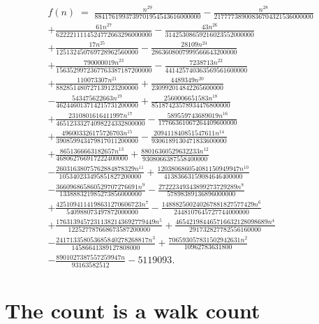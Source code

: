 \documentclass[11pt,a4paper]{article}
\theoremstyle{plain}
\theoremstyle{definition}
\begin{document}
\begin{multline*}
f(n)\;=\;\frac{n^{29}}{8841761993739701954543616000000} - \frac{n^{28}}{21777738900836704321536000000} \\
+ \frac{61 n^{27}}{6222211114524772663296000000} - \frac{43 n^{26}}{31425308659216023552000000} \\
+ \frac{17 n^{25}}{125132450769728962560000} - \frac{28109 n^{24}}{2863608007999566643200000} \\
+ \frac{790000019 n^{23}}{1563529972367763387187200000} - \frac{7238713 n^{22}}{441425740363569561600000} \\
+ \frac{110073307 n^{21}}{882851480727139123200000} + \frac{4489349 n^{20}}{230992014842265600000} \\
- \frac{543475622663 n^{19}}{462446013714215731200000} + \frac{2560006651583 n^{18}}{85187423578934476800000} \\
+ \frac{2310801616411997 n^{17}}{46512333274098224332800000} - \frac{589559743689019 n^{16}}{17766361067264409600000} \\
+ \frac{496003326175726703 n^{15}}{390859943479817011200000} - \frac{209411840851547611 n^{14}}{9306189130471833600000} \\
+ \frac{8651366663182657 n^{13}}{468062766917222400000} + \frac{88016360529632233 n^{12}}{9308066387558400000} \\
- \frac{26031638075762884878329 n^{11}}{105340233495851827200000} + \frac{120380686054081150949947 n^{10}}{41383663159084646400000} \\
- \frac{366096865860529707276691 n^{9}}{133888321985273856000000} - \frac{27222349343899273729289 n^{8}}{57898389136896000000} \\
+ \frac{4251094114198631270606723 n^{7}}{540988073497872000000} - \frac{148882500240267881827577429 n^{6}}{2448107645727744000000} \\
+ \frac{17631394572311382143692779449 n^{5}}{122527787668673587200000} + \frac{465421984465716632128098689 n^{4}}{291732827782556160000} \\
- \frac{241713358053685840278268817 n^{3}}{14586641389127808000} + \frac{706593057831502942631 n^{2}}{10962783631800} \\
- \frac{8901027387557259947 n}{93163582512} - 5119093.
\end{multline*}

\section{The count is a walk count}
\end{document}
